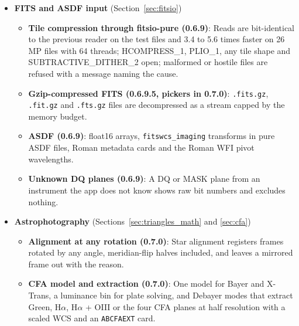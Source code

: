 \documentclass[11pt,a4paper]{article}
\newcommand{\code}[1]{\texttt{\small #1}}
\begin{document}
\begin{itemize}[nosep]
\begin{itemize}[nosep]
        \item \textbf{1D spectra as documents (0.7.0)}: JWST \code{x1d} tables and 1D FITS arrays with a wavelength axis are spectrum rows in the Files panel; the Cube tool plots them, measures lines with their FLUX\_ERROR or ERR as weights and their DQ-flagged channels left out, states whether the wavelengths are air or vacuum, exports and reopens them as CSV, and compares them with a second spectrum.
        \item \textbf{Line measurement errors (0.6.9.5, 0.7.0)}: Every line measurement lists its error source, the pixel, level and slope terms of the flux error and the channels left out.
        \end{itemize}
    \item \textbf{FITS and ASDF input} (Section~\ref{sec:fitsio})
        \begin{itemize}[nosep]
        \item \textbf{Tile compression through fitsio-pure (0.6.9)}: Reads are bit-identical to the previous reader on the test files and 3.4 to 5.6 times faster on 26\,MP files with 64 threads; HCOMPRESS\_1, PLIO\_1, any tile shape and SUBTRACTIVE\_DITHER\_2 open; malformed or hostile files are refused with a message naming the cause.
        \item \textbf{Gzip-compressed FITS (0.6.9.5, pickers in 0.7.0)}: \code{.fits.gz}, \code{.fit.gz} and \code{.fts.gz} files are decompressed as a stream capped by the memory budget.
        \item \textbf{ASDF (0.6.9)}: float16 arrays, \code{fitswcs\_imaging} transforms in pure ASDF files, Roman metadata cards and the Roman WFI pivot wavelengths.
        \item \textbf{Unknown DQ planes (0.6.9)}: A DQ or MASK plane from an instrument the app does not know shows raw bit numbers and excludes nothing.
        \end{itemize}
    \item \textbf{Astrophotography} (Sections~\ref{sec:triangles_math} and \ref{sec:cfa})
        \begin{itemize}[nosep]
        \item \textbf{Alignment at any rotation (0.7.0)}: Star alignment registers frames rotated by any angle, meridian-flip halves included, and leaves a mirrored frame out with the reason.
        \item \textbf{CFA model and extraction (0.7.0)}: One model for Bayer and X-Trans, a luminance bin for plate solving, and Debayer modes that extract Green, H$\alpha$, H$\alpha$ + OIII or the four CFA planes at half resolution with a scaled WCS and an \code{ABCFAEXT} card.

\end{itemize}
\end{itemize}
\end{document}

